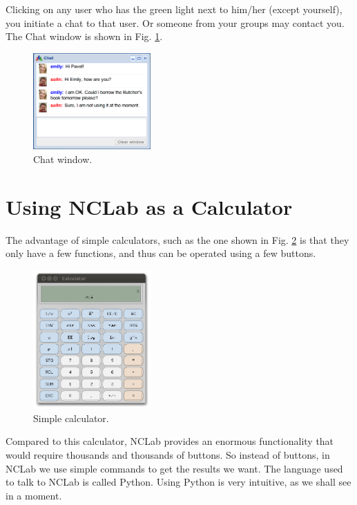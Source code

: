 \documentclass[article,A4,12pt]{llncs}
\begin{document}
\noindent
Clicking on any user who has the green light next to him/her (except yourself),
you initiate a chat to that user. Or someone from your groups may contact you. 
The Chat window is shown in Fig. \ref{fig:chat}.

\begin{figure}[!ht]
\begin{center}
\includegraphics[width=0.4\textwidth]{img/chat.png}
\end{center}
\caption{Chat window.}
\label{fig:chat}
\end{figure}


\section{Using NCLab as a Calculator}

The advantage of simple calculators, such as the one shown in Fig. \ref{fig:xcalc}
is that they only have a few functions, and thus can be operated using a few buttons.

\begin{figure}[!ht]
\begin{center}
\includegraphics[width=0.4\textwidth]{img/xcalc.png}
\end{center}
\caption{Simple calculator.}
\label{fig:xcalc}
\end{figure}
\noindent
Compared to this calculator, NCLab provides an enormous functionality 
that would require thousands and thousands of buttons. So instead of buttons,
in NCLab we use simple commands to get the results we want. The language used 
to talk to NCLab is called Python. Using Python is very intuitive, 
as we shall see in a moment.
\end{document}
